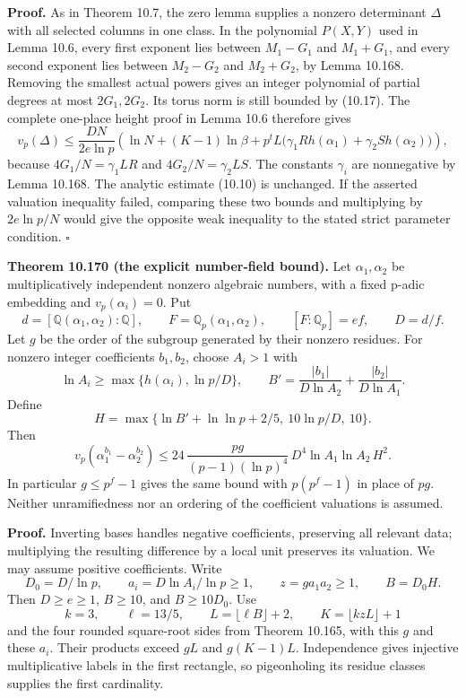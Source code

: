 \documentclass[
  11pt,
  a4paper,
]{article}
\begin{document}
\textbf{Proof.} As in Theorem 10.7, the zero lemma supplies a nonzero
determinant \(\Delta\) with all selected columns in one class. In the
polynomial \(P(X,Y)\) used in Lemma 10.6, every first exponent lies
between \(M_1-G_1\) and \(M_1+G_1\), and every second exponent lies
between \(M_2-G_2\) and \(M_2+G_2\), by Lemma 10.168. Removing the
smallest actual powers gives an integer polynomial of partial degrees at
most \(2G_1,2G_2\). Its torus norm is still bounded by (10.17). The
complete one-place height proof in Lemma 10.6 therefore gives \[
v_p(\Delta)\le\frac{DN}{2e\ln p}
\left(\ln N+(K-1)\ln\beta+
p^tL\bigl(\gamma_1Rh(\alpha_1)+\gamma_2Sh(\alpha_2)\bigr)\right),
\tag{10.604}
\] because \(4G_1/N=\gamma_1LR\) and \(4G_2/N=\gamma_2LS\). The
constants \(\gamma_i\) are nonnegative by Lemma 10.168. The analytic
estimate (10.10) is unchanged. If the asserted valuation inequality
failed, comparing these two bounds and multiplying by \(2e\ln p/N\)
would give the opposite weak inequality to the stated strict parameter
condition. \(\square\)

\textbf{Theorem 10.170 (the explicit number-field bound).} Let
\(\alpha_1,\alpha_2\) be multiplicatively independent nonzero algebraic
numbers, with a fixed p-adic embedding and \(v_p(\alpha_i)=0\). Put \[
d=[\mathbb Q(\alpha_1,\alpha_2):\mathbb Q],\qquad
F=\mathbb Q_p(\alpha_1,\alpha_2),\qquad
[F:\mathbb Q_p]=ef,\qquad D=d/f.
\tag{10.605}
\] Let \(g\) be the order of the subgroup generated by their nonzero
residues. For nonzero integer coefficients \(b_1,b_2\), choose \(A_i>1\)
with \[
\ln A_i\ge\max\{h(\alpha_i),\ln p/D\},
\qquad B'=\frac{|b_1|}{D\ln A_2}+\frac{|b_2|}{D\ln A_1}.
\tag{10.606}
\] Define \[
H=\max\{\ln B'+\ln\ln p+2/5,\ 10\ln p/D,\ 10\}.
\tag{10.607}
\] Then \[
v_p(\alpha_1^{b_1}-\alpha_2^{b_2})
\le24\,\frac{pg}{(p-1)(\ln p)^4}\,
D^4\ln A_1\ln A_2\,H^2.
\tag{10.608}
\] In particular \(g\le p^f-1\) gives the same bound with \(p(p^f-1)\)
in place of \(pg\). Neither unramifiedness nor an ordering of the
coefficient valuations is assumed.

\textbf{Proof.} Inverting bases handles negative coefficients,
preserving all relevant data; multiplying the resulting difference by a
local unit preserves its valuation. We may assume positive coefficients.
Write \[
D_0=D/\ln p,\qquad a_i=D\ln A_i/\ln p\ge1,\qquad
z=ga_1a_2\ge1,\qquad B=D_0H.
\tag{10.609}
\] Then \(D\ge e\ge1\), \(B\ge10\), and \(B\ge10D_0\). Use \[
k=3,\qquad \ell=13/5,\qquad
L=\lfloor\ell B\rfloor+2,\qquad K=\lfloor kzL\rfloor+1
\tag{10.610}
\] and the four rounded square-root sides from Theorem 10.165, with this
\(g\) and these \(a_i\). Their products exceed \(gL\) and \(g(K-1)L\).
Independence gives injective multiplicative labels in the first
rectangle, so pigeonholing its residue classes supplies the first
cardinality.
\end{document}
